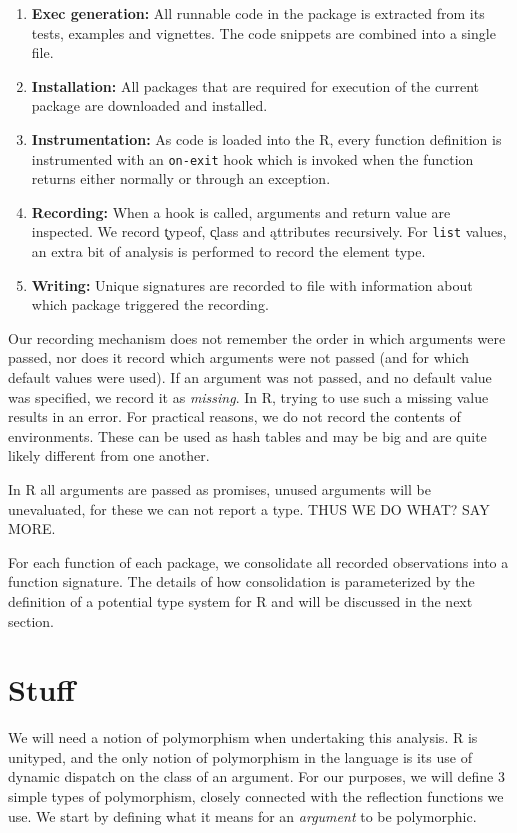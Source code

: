 \documentclass[acmsmall,10pt,review,anonymous]{acmart}\settopmatter{printfolios=true,printccs=false,printacmref=false}
\newcommand{\code}[1]{\lstinline|#1|\xspace}
\begin{document}
\begin{enumerate}
\item {\bf Exec generation:} All runnable code in the package is extracted
  from its tests, examples and vignettes. The code snippets are combined
  into a single file.
\item {\bf Installation:} All packages that are required for execution of
  the current package are downloaded and installed.
\item {\bf Instrumentation:} As code is loaded into the R, every function
  definition is instrumented with an \code{on-exit} hook which is invoked
  when the function returns either normally or through an exception.
\item {\bf Recording:} When a hook is called, arguments and return value are
  inspected. We record \k{typeof}, \k{class} and \k{attributes} recursively.
  For \code{list} values, an extra bit of analysis is performed to record
  the element type.
\item {\bf Writing:} Unique signatures are recorded to file with information
  about which package triggered the recording.
\end{enumerate}

Our recording mechanism does not remember the order in which arguments were
passed, nor does it record which arguments were not passed (and for which
default values were used). If an argument was not passed, and no default
value was specified, we record it as \emph{missing}. In R, trying to use
such a missing value results in an error. For practical reasons, we do not
record the contents of environments. These can be used as hash tables and
may be big and are quite likely different from one another.

In R all arguments are passed as promises, unused arguments will be
unevaluated, for these we can not report a type. THUS WE DO WHAT? SAY MORE.

For each function of each package, we consolidate all recorded observations
into a function signature. The details of how consolidation is parameterized
by the definition of a potential type system for R and will be discussed in
the next section.


\section{Stuff}

We will need a notion of polymorphism when undertaking this analysis. R
is unityped, and the only notion of polymorphism in the language is its use
of dynamic dispatch on the class of an argument.  For our purposes, we will
define 3 simple types of polymorphism, closely connected with the reflection
functions we use.  We start by defining what it means for an {\it argument}
to be polymorphic.  
\end{document}
